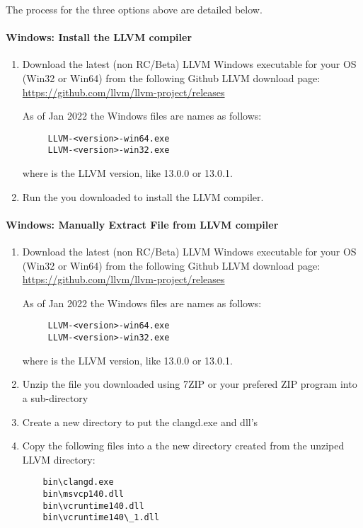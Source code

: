 The  process for the three options above are detailed below.

\paragraph*{Windows: Install the LLVM compiler}\label{sec:llvm_install}

\begin{enumerate}[noitemsep]
\item Download the latest (non RC/Beta) LLVM Windows executable for your OS (Win32 or Win64) from the following Github LLVM download page: \newline
      \url{https://github.com/llvm/llvm-project/releases} \newline

  As of Jan 2022 the Windows files are names as follows:
  \begin{verbatim}
     LLVM-<version>-win64.exe
     LLVM-<version>-win32.exe
  \end{verbatim}
  where  is the LLVM version, like 13.0.0 or 13.0.1.\\

\item Run the  you downloaded to install the LLVM compiler.
\end{enumerate}

\paragraph*{Windows: Manually Extract File from LLVM compiler}\label{sec:llvm_extract}
\begin{enumerate}[noitemsep]
\item Download the latest (non RC/Beta) LLVM Windows executable for your OS (Win32 or Win64) from the following Github LLVM download page:\newline
      \url{https://github.com/llvm/llvm-project/releases} \newline

  As of Jan 2022 the Windows files are names as follows:
  \begin{verbatim}
     LLVM-<version>-win64.exe
     LLVM-<version>-win32.exe
  \end{verbatim}
  where  is the LLVM version, like 13.0.0 or 13.0.1.\\

\item Unzip the  file you downloaded using 7ZIP or your prefered ZIP program into a sub-directory
\item Create a new directory to put the clangd.exe and dll's
\item Copy the following files into a the new directory created from the unziped LLVM directory:
    \begin{verbatim}
    bin\clangd.exe
    bin\msvcp140.dll
    bin\vcruntime140.dll
    bin\vcruntime140\_1.dll
    \end{verbatim}
\end{enumerate}

